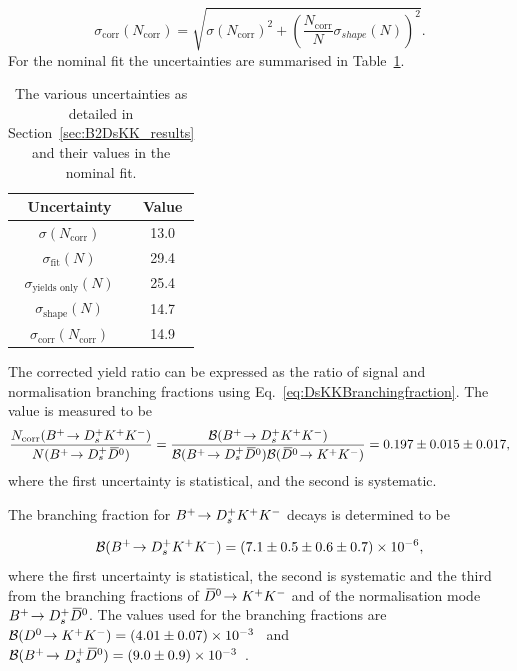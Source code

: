 \begin{equation}
\sigma_{\text{corr}}(N_{\text{corr}}) =  \sqrt{  \sigma(N_{\text{corr}})^{2} +  \left( \frac{N_{\text{corr}}}{N} \sigma_{shape}(N) \right)^{2}}.
\end{equation}
For the nominal fit the uncertainties are summarised in Table~\ref{table:DsKK_fit_errors}.

\begin{table}[!ht]
\centering
\begin{tabular}{  c | c   }
\hline
Uncertainty                             &  Value \\
\hline 
$\sigma(N_{\text{corr}})$               & 13.0\\
$\sigma_{\text{fit}}(N)$                & 29.4\\
$\sigma_{\text{yields only}}(N)$        & 25.4\\
$\sigma_{\text{shape}}(N)$              & 14.7 \\ 
\hline
$\sigma_{\text{corr}}(N_{\text{corr}})$ & 14.9 \\ 
\hline
\end{tabular}
\caption{The various uncertainties as detailed in Section~\ref{sec:B2DsKK_results} and their values in the nominal fit.}
\label{table:DsKK_fit_errors}
\end{table}

The corrected yield ratio can be expressed as the ratio of signal and normalisation branching fractions using Eq.~\ref{eq:DsKKBranchingfraction}. The value is measured to be 
\begin{equation}
\frac{ N_{\text{corr}}({{{B}^+}}\!\rightarrow {\ensuremath{{D}^+_{s}}}{\ensuremath{{K}^+}}{\ensuremath{{K}^-}}) }{ N({{{B}^+}}\!\rightarrow {\ensuremath{{D}^+_{s}}}{\ensuremath{{\kern 0.2em\overline{\kern -0.2em D}{}}{}^0}}) } = \frac{\mathcal{B}({{{B}^+}}\!\rightarrow {\ensuremath{{D}^+_{s}}}{\ensuremath{{K}^+}}{\ensuremath{{K}^-}})}{\mathcal{B}({{{B}^+}}\!\rightarrow {\ensuremath{{D}^+_{s}}}{\ensuremath{{\kern 0.2em\overline{\kern -0.2em D}{}}{}^0}})\mathcal{B}({{\kern 0.2em\overline{\kern -0.2em D}{}}{}^0}\!\rightarrow {\ensuremath{{K}^+}}{\ensuremath{{K}^-}})}  = 0.197 \pm 0.015 \pm 0.017, 
\end{equation}
where the first uncertainty is statistical, and the second is systematic.

The branching fraction for ${{{B}^+}}\!\rightarrow {\ensuremath{{D}^+_{s}}}{\ensuremath{{K}^+}}{\ensuremath{{K}^-}}$ decays is determined to be 

\begin{equation}
\mathcal{B}({{{B}^+}}\!\rightarrow {\ensuremath{{D}^+_{s}}}{\ensuremath{{K}^+}}{\ensuremath{{K}^-}}) = (7.1 \pm 0.5 \pm 0.6 \pm 0.7) \times 10^{-6},
\end{equation}
where the first uncertainty is statistical, the second is systematic and the third from the branching fractions of ${{\kern 0.2em\overline{\kern -0.2em D}{}}{}^0}\!\rightarrow {\ensuremath{{K}^+}}{\ensuremath{{K}^-}}$ and of the normalisation mode ${{{B}^+}}\!\rightarrow {\ensuremath{{D}^+_{s}}}{\ensuremath{{\kern 0.2em\overline{\kern -0.2em D}{}}{}^0}}$. 
The values used for the branching fractions are $\mathcal{B}({{D}^0}\!\rightarrow {\ensuremath{{K}^+}}{\ensuremath{{K}^-}}) = (4.01 \pm 0.07)\times10^{-3}$~\cite{PDG2016} and $\mathcal{B}({{{B}^+}}\!\rightarrow {\ensuremath{{D}^+_{s}}}{\ensuremath{{\kern 0.2em\overline{\kern -0.2em D}{}}{}^0}}) = (9.0 \pm 0.9)\times10^{-3}$~\cite{PDG2016}. 

